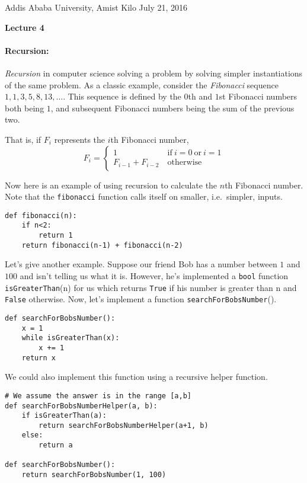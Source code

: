 \documentclass[11pt]{article}
\newlength{\toppush}
\newcommand{\htitle}[2]{\noindent\vspace*{-\toppush}\newline\parbox{6.5in}
 {\large Addis Ababa University, Amist Kilo \hfill #1\newline
\hspace*{\fill}{\bf Algorithms and Programming for High Schoolers} \hspace*{\fill} \newline
\mbox{}\hrulefill\mbox{}}\vspace*{1ex}\mbox{}\newline
\begin{center}{\Large\bf #2}\end{center}}
\begin{document}
\htitle{July 21, 2016}{Lecture 4}

\paragraph{\Large Recursion:}

{\em Recursion} in computer science solving a problem by solving
simpler instantiations of the same problem.  As a classic example,
consider the {\em Fibonacci} sequence $1,1,3,5,8,13,\ldots$.  This
sequence is defined by the $0$th and $1$st Fibonacci numbers both
being $1$, and subsequent Fibonacci numbers being the sum of the
previous two.

That is, if $F_i$ represents the $i$th Fibonacci number,
$$
F_i = \begin{cases} 1 \ &
  \mathrm{if}\ i=0\ \mathrm{or}\ i = 1
\\ F_{i-1} + F_{i-2} \
&\mathrm{otherwise} \end{cases}
$$

Now here is an example of using recursion to calculate the $n$th
Fibonacci number.  Note that the \texttt{fibonacci} function calls
itself on smaller, i.e.\ simpler, inputs.

\begin{verbatim}
def fibonacci(n):
    if n<2:
        return 1
    return fibonacci(n-1) + fibonacci(n-2)
\end{verbatim}

Let's give another example.  Suppose our friend Bob has a number
between $1$ and $100$ and isn't telling us what it is.  However, he's
implemented a \texttt{bool} function \texttt{isGreaterThan}(n) for us
which returns \texttt{True} if his number is greater than n and
\texttt{False} otherwise.  Now, let's implement a function
\texttt{searchForBobsNumber}().

\begin{verbatim}
def searchForBobsNumber():
    x = 1
    while isGreaterThan(x):
        x += 1
    return x
\end{verbatim}

We could also implement this function using a recursive helper
function.

\begin{verbatim}
# We assume the answer is in the range [a,b]
def searchForBobsNumberHelper(a, b):
    if isGreaterThan(a):
        return searchForBobsNumberHelper(a+1, b)
    else:
        return a

def searchForBobsNumber():
    return searchForBobsNumber(1, 100)
\end{verbatim}
\end{document}
